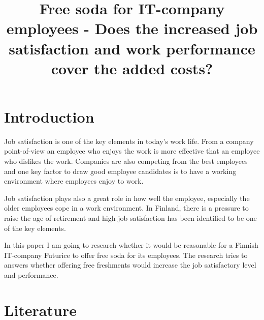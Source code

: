 \documentclass[a4paper]{article}
\begin{document}
\title{\huge Free soda for IT-company employees - Does the increased job satisfaction and work performance cover the added costs?}
\date{\vspace{-5ex}}
\maketitle

\normalsize

\begin{comment}
\title{\huge Free soda for IT-company employees}
\date{2.1.2013}
\author{Mikko Koski \\ mikko.koski@aalto.fi}
\maketitle
\end{comment}

\large

\section{Introduction}

\begin{comment}
Why is this research important? 
Is there a bigger phenomenon that this research of yours is part of? 
Why people in your profession should care about this thesis?
\end{comment}

Job satisfaction is one of the key elements in today's work life. From a company point-of-view an employee who enjoys the work is more effective that an employee who dislikes the work. Companies are also competing from the best employees and one key factor to draw good employee candidates is to have a working environment where employees enjoy to work.

Job satisfaction plays also a great role in how well the employee, especially the older employees cope in a work environment. In Finland, there is a pressure to raise the age of retirement and high job satisfaction has been identified to be one of the key elements.

In this paper I am going to research whether it would be reasonable for a Finnish IT-company Futurice to offer free soda for its employees. The research tries to answers whether offering free freshments would increase the job satisfactory level and performance. 

\section{Literature}
\end{document}

